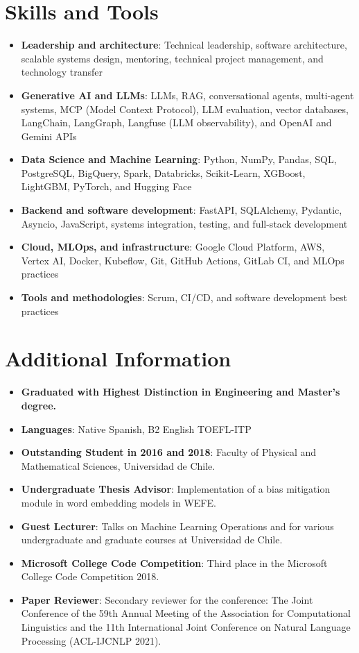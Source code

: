 \documentclass[letterpaper,11pt]{article}
\newcommand{\resumeItem}[2]{
  \item\small{
    \textbf{#1}{: #2\vspace{-2pt}}
  }
}
\newcommand{\resumeSubItem}[2]{\resumeItem{#1}{#2}\vspace{-4pt}}
\newcommand{\resumeItemNoColon}[2]{
  \item\small{
    \textbf{#1}{ #2\vspace{-2pt}}
  }
}
\newcommand{\resumeSubItemNoColon}[2]{\resumeItemNoColon{#1}{#2}\vspace{-4pt}}
\newcommand{\resumeSubHeadingListStart}{\begin{itemize}[leftmargin=*]}
\newcommand{\resumeSubHeadingListEnd}{\end{itemize}}
\begin{document}
 \section{Skills and Tools}
 \resumeSubHeadingListStart
    \resumeSubItem{Leadership and architecture}{Technical leadership, software architecture, scalable systems design, mentoring, technical project management, and technology transfer}
    \resumeSubItem{Generative AI and LLMs}{LLMs, RAG, conversational agents, multi-agent systems, MCP (Model Context Protocol), LLM evaluation, vector databases, LangChain, LangGraph, Langfuse (LLM observability), and OpenAI and Gemini APIs}
    \resumeSubItem{Data Science and Machine Learning}{Python, NumPy, Pandas, SQL, PostgreSQL, BigQuery, Spark, Databricks, Scikit-Learn, XGBoost, LightGBM, PyTorch, and Hugging Face}
    \resumeSubItem{Backend and software development}{FastAPI, SQLAlchemy, Pydantic, Asyncio, JavaScript, systems integration, testing, and full-stack development}
    \resumeSubItem{Cloud, MLOps, and infrastructure}{Google Cloud Platform, AWS, Vertex AI, Docker, Kubeflow, Git, GitHub Actions, GitLab CI, and MLOps practices}
    \resumeSubItem{Tools and methodologies}{Scrum, CI/CD, and software development best practices}
 \resumeSubHeadingListEnd

\section{Additional Information}
  \resumeSubHeadingListStart
    \resumeSubItemNoColon{Graduated with Highest Distinction in Engineering and Master's degree.}{}
    \resumeSubItem{Languages}
      {Native Spanish, B2 English TOEFL-ITP}
    \resumeSubItem{Outstanding Student in 2016 and 2018}
      {Faculty of Physical and Mathematical Sciences, Universidad de Chile.}
    \resumeSubItem{Undergraduate Thesis Advisor}
      {Implementation of a bias mitigation module in word embedding models in WEFE.}
    \resumeSubItem{Guest Lecturer}
      {Talks on Machine Learning Operations and for various undergraduate and graduate courses at Universidad de Chile.}
    \resumeSubItem{Microsoft College Code Competition}
      {Third place in the Microsoft College Code Competition 2018.}
    \resumeSubItem{Paper Reviewer}
      {Secondary reviewer for the conference: The Joint Conference of the 59th Annual Meeting of the Association for Computational Linguistics and the 11th International Joint Conference on Natural Language Processing (ACL-IJCNLP 2021).}
  \resumeSubHeadingListEnd

\end{document}

